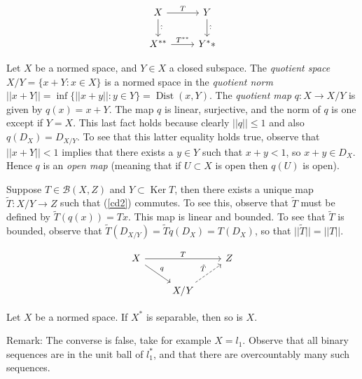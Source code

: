 \begin{equation}\label{cd1}
\begin{tikzcd}
X\arrow{r}{T}\arrow{d}{\hat\cdot} & Y \arrow{d}{\hat\cdot}\\
X^{**} \arrow{r}{T^{**}}& Y^**
\end{tikzcd}
\end{equation}


Let $X$ be a normed space,
and $Y\in X$ a closed subspace.
The \emph{quotient space} $X/Y=\{x+Y:x\in X\}$ is a normed space in the \emph{quotient norm}
$||x+Y||=\inf\{||x+y||:y\in Y\}=\operatorname{Dist}(x,Y)$.
The \emph{quotient map} $q:X\to X/Y$ is given by $q(x)=x+Y$.
The map $q$ is linear, surjective, and the norm of $q$ is one except if $Y=X$.
This last fact holds because clearly $||q||\leq 1$
and also $q(D_X)=D_{X/Y}$.
To see that this latter equality holds true,
observe that
$||x+Y||<1$ implies that there exists a $y\in Y$ such that
$x+y<1$, so $x+y\in D_X$.
Hence $q$ is an \emph{open map}
(meaning that if $U\subset X$ is open then $q(U)$ is open).

Suppose $T\in\mathcal{B}(X,Z)$ and $Y\subset \operatorname{Ker} T$, then there exists a unique map
$\tilde T:X/Y\to Z$ such that
  (\ref{cd2}) commutes.
To see this,
observe that $\tilde T$ must be defined by $\tilde T(q(x))=Tx$.
This map is linear and bounded.
To see that $\tilde T$ is bounded, observe that
$\tilde T(D_{X/Y})=\tilde T q(D_X)=T(D_X)$, so that $||\tilde T||=||T||$.

\begin{equation}\label{cd2}
\begin{tikzcd}
X\arrow{rr}{T}\arrow{rd}{q} && Z \\
& X/Y\arrow[dashed]{ur}{\tilde T} &
\end{tikzcd}
\end{equation}


\begin{theorem}
Let $X$ be a normed space. If $X^*$ is separable, then so is $X$.
\end{theorem}

Remark: The converse is false, take for example $X=l_1$. Observe that all binary sequences
are in the unit ball of $l_1^*$, and that there are overcountably many such sequences.

